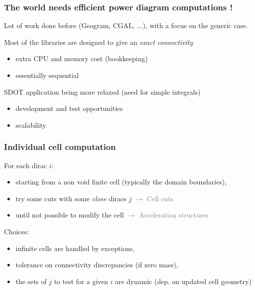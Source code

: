 \documentclass[aspectratio=169]{beamer}
\begin{document}
\begin{frame}
    \frametitle{The world needs efficient power diagram computations !}

    Lot of work done before (Geogram, CGAL, ...), with a focus on the generic case.
    
    \vfill
    Most of the libraries are designed to give an \textit{exact connectivity}
    \begin{itemize}
        \item extra CPU and memory cost (bookkeeping)
        \item essentially sequential
    \end{itemize}

    \vfill
    SDOT application being more relaxed (need for simple integrals)
    \begin{itemize}
        \item development and test opportunities 
        \item scalability
    \end{itemize}
\end{frame}

\begin{frame}
    \frametitle{Individual cell computation}

    For each dirac $i$:
    \begin{itemize}
        \item starting from a non void finite cell (typically the domain boundaries),
        \item try some cuts with some \textit{close} diracs $j$
            \hfill{\textcolor{gray}{$\rightarrow$ Cell cuts}}

        \item until not possible to modify the cell
            \hfill{\textcolor{gray}{$\rightarrow$ Acceleration structures}}
    \end{itemize}
    
    \vfill
    Choices:
    \begin{itemize}
        \item infinite cells are handled by exceptions,
        \item tolerance on connectivity discrepancies (if zero mass),
        \item the sets of $j$ to test for a given $i$ are dynamic (dep. on updated cell geometry)
    \end{itemize}
    
\end{frame}
\end{document}
